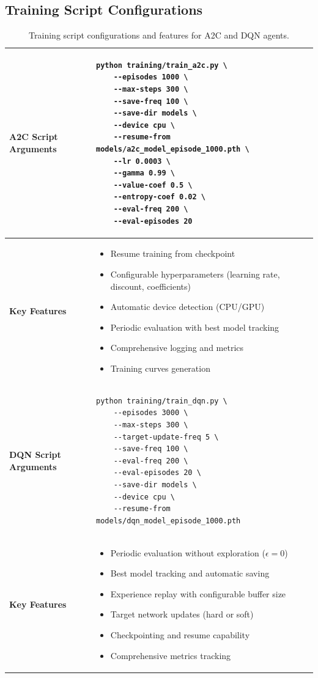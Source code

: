 \subsection{Training Script Configurations}

\begin{table}[h!]
\centering
\small
\begin{tabular}{|l|p{7cm}|}
\hline
\textbf{A2C Script Arguments} &
\begin{verbatim}
python training/train_a2c.py \
    --episodes 1000 \
    --max-steps 300 \
    --save-freq 100 \
    --save-dir models \
    --device cpu \
    --resume-from models/a2c_model_episode_1000.pth \
    --lr 0.0003 \
    --gamma 0.99 \
    --value-coef 0.5 \
    --entropy-coef 0.02 \
    --eval-freq 200 \
    --eval-episodes 20
\end{verbatim} \\
\hline
\textbf{Key Features} &
\begin{itemize}[leftmargin=*,nosep]
    \item Resume training from checkpoint
    \item Configurable hyperparameters (learning rate, discount, coefficients)
    \item Automatic device detection (CPU/GPU)
    \item Periodic evaluation with best model tracking
    \item Comprehensive logging and metrics
    \item Training curves generation
\end{itemize} \\
\hline
\textbf{DQN Script Arguments} &
\begin{verbatim}
python training/train_dqn.py \
    --episodes 3000 \
    --max-steps 300 \
    --target-update-freq 5 \
    --save-freq 100 \
    --eval-freq 200 \
    --eval-episodes 20 \
    --save-dir models \
    --device cpu \
    --resume-from models/dqn_model_episode_1000.pth
\end{verbatim} \\
\hline
\textbf{Key Features} &
\begin{itemize}[leftmargin=*,nosep]
    \item Periodic evaluation without exploration ($\epsilon = 0$)
    \item Best model tracking and automatic saving
    \item Experience replay with configurable buffer size
    \item Target network updates (hard or soft)
    \item Checkpointing and resume capability
    \item Comprehensive metrics tracking
\end{itemize} \\
\hline
\end{tabular}
\caption{Training script configurations and features for A2C and DQN agents.}
\end{table}

